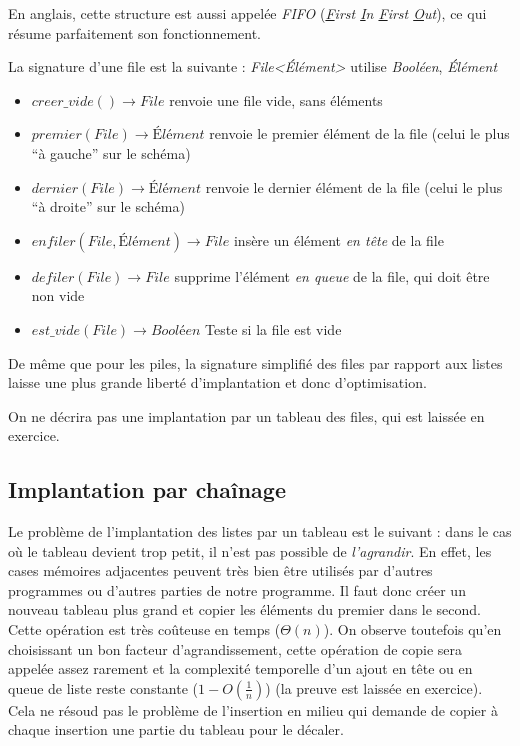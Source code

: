 \documentclass[../../../main.tex]{subfiles}
\begin{document}
En anglais, cette structure est aussi appelée \textit{FIFO} (\textit{\underline{F}irst \underline{I}n \underline{F}irst \underline{O}ut}), ce qui résume parfaitement son fonctionnement.

La signature d'une file est la suivante :\newline
\textit{File\textless Élément\textgreater} utilise \textit{Booléen}, \textit{Élément}
\begin{itemize}
	\item $creer\_vide()\rightarrow File$ renvoie une file vide, sans éléments
	\item $premier(File)\rightarrow \textit{Élément}$ renvoie le premier élément de la file (celui le plus ``à gauche'' sur le schéma)
	\item $dernier(File)\rightarrow \textit{Élément}$ renvoie le dernier élément de la file (celui le plus ``à droite'' sur le schéma)
	\item $enfiler(File, \textit{Élément}) \rightarrow File$ insère un élément \textit{en tête} de la file
	\item $defiler(File)\rightarrow File$ supprime l'élément \textit{en queue} de la file, qui doit être non vide
	\item $est\_vide(File)\rightarrow \textit{Booléen}$ Teste si la file est vide
\end{itemize}
De même que pour les piles, la signature simplifié des files par rapport aux listes laisse une plus grande liberté d'implantation et donc d'optimisation.

On ne décrira pas une implantation par un tableau des files, qui est laissée en exercice.
\subsection{Implantation par chaînage}
Le problème de l'implantation des listes par un tableau est le suivant : dans le cas où le tableau devient trop petit, il n'est pas possible de \textit{l'agrandir}. En effet, les cases mémoires adjacentes peuvent très bien être utilisés par d'autres programmes ou d'autres parties de notre programme. Il faut donc créer un nouveau tableau plus grand et copier les éléments du premier dans le second. Cette opération est très coûteuse en temps ($\Theta(n)$). On observe toutefois qu'en choisissant un bon facteur d'agrandissement, cette opération de copie sera appelée assez rarement et la complexité temporelle d'un ajout en tête ou en queue de liste reste constante ($1 - O\left(\frac{1}{n}\right)$) (la preuve est laissée en exercice). Cela ne résoud pas le problème de l'insertion en milieu qui demande de copier à chaque insertion une partie du tableau pour le décaler.
\end{document}
